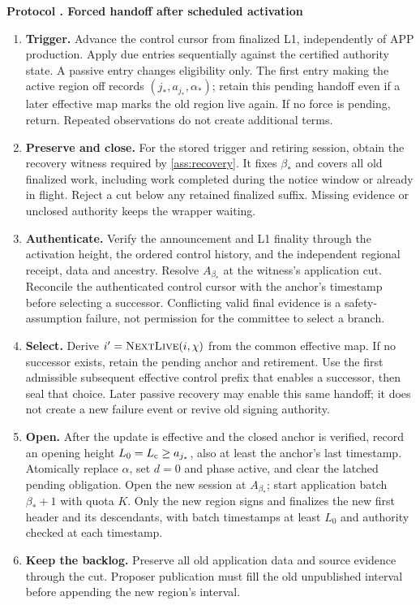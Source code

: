 \documentclass[11pt,a4paper,onecolumn]{article}
\newcommand{\Proc}[1]{\textnormal{\textsc{#1}}}
\newcounter{protocol}
\newenvironment{protocol}[2]{\refstepcounter{protocol}\label{#1}
\begin{mdframed}[nobreak=true,linewidth=.6pt,skipabove=9pt,skipbelow=9pt,
innertopmargin=7pt,innerbottommargin=7pt]\small
\noindent\textbf{Protocol \theprotocol. #2}\par\smallskip}{\end{mdframed}}
\begin{document}
\begin{protocol}{alg:force}{Forced handoff after scheduled activation}
\begin{enumerate}[label=\textbf{F\arabic*.}]
\item \textbf{Trigger.} Advance the control cursor from finalized L1,
independently of APP production. Apply due entries sequentially against
the certified authority state. A passive entry changes eligibility only.
The first entry making the active region off records
$(j_*,a_{j_*},\alpha_*)$; retain this pending handoff even if a later effective map
marks the old region live again. If no force is pending, return. Repeated
observations do not create additional terms.
\item \textbf{Preserve and close.} For the stored trigger and retiring
session, obtain the recovery witness required by \cref{ass:recovery}.
It fixes $\beta_*$ and covers all old finalized work, including work
completed during the notice window or already in flight. Reject a cut
below any retained finalized suffix. Missing evidence or unclosed authority
keeps the wrapper waiting.
\item \textbf{Authenticate.} Verify the announcement and L1 finality through
the activation height, the ordered control history, and the independent
regional receipt, data and ancestry. Resolve $A_{\beta_*}$ at the witness's
application cut. Reconcile the authenticated control cursor with the
anchor's timestamp before selecting a successor. Conflicting valid final evidence is a safety-assumption
failure, not permission for the committee to select a branch.
\item \textbf{Select.} Derive $i'=\Proc{NextLive}(i,\chi)$ from the common
effective map. If no successor exists, retain the pending anchor and
retirement. Use the first admissible subsequent effective control prefix that
enables a successor, then seal that choice. Later passive recovery may
enable this same handoff; it does not create a new failure event or revive
old signing authority.
\item \textbf{Open.} After the update is effective and the closed anchor is
verified, record an opening height $L_0=L_{\rm c}\geq a_{j_*}$, also at
least the anchor's last timestamp. Atomically replace $\alpha$, set $d=0$
and phase active, and clear the
latched pending obligation. Open the new session at $A_{\beta_*}$; start
application batch $\beta_*+1$ with quota $K$. Only the new region signs and finalizes the
new first header and its descendants, with batch timestamps at least
$L_0$ and authority checked at each timestamp.
\item \textbf{Keep the backlog.} Preserve all old application data and
source evidence through the cut. Proposer publication must fill the old
unpublished interval before appending the new region's interval.
\end{enumerate}
\end{protocol}
\end{document}
